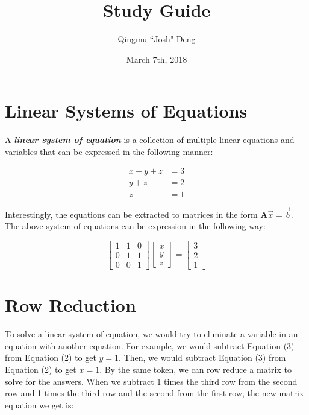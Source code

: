 \documentclass[11pt]{article}
\begin{document}
\title{Study Guide}
\author{Qingmu ``Josh" Deng}
\date{March 7th, 2018}

\maketitle
\section{Linear Systems of Equations}
A \emph{\textbf{linear system of equation}} is a collection of multiple linear equations and variables that can be expressed in the following manner:

\begin{align}
    x +  y + z  &= 3 \\
         y +  z &= 2 \\
              z &= 1
\end{align}

Interestingly, the equations can be extracted to matrices in the form $\textbf{A}\vec{x} = \vec{b}$. The above system of equations can be expression in the following way:

\[
\begin{bmatrix}
    1 & 1 & 0 \\
    0 & 1 & 1 \\
    0 & 0 & 1 
\end{bmatrix}
\begin{bmatrix}
    x\\y\\z
\end{bmatrix}
=
\begin{bmatrix}
    3\\2\\1
\end{bmatrix}
\]

\section{Row Reduction}
To solve a linear system of equation, we would try to eliminate a variable in an equation with another equation. For example, we would subtract Equation (3) from Equation (2) to get $y = 1$. Then, we would subtract Equation (3) from Equation (2) to get $x = 1$. By the same token, we can row reduce a matrix to solve for the answers. When we subtract 1 times the third row from the second row and 1 times the third row and the second from the first row, the new matrix equation we get is:
\end{document}
